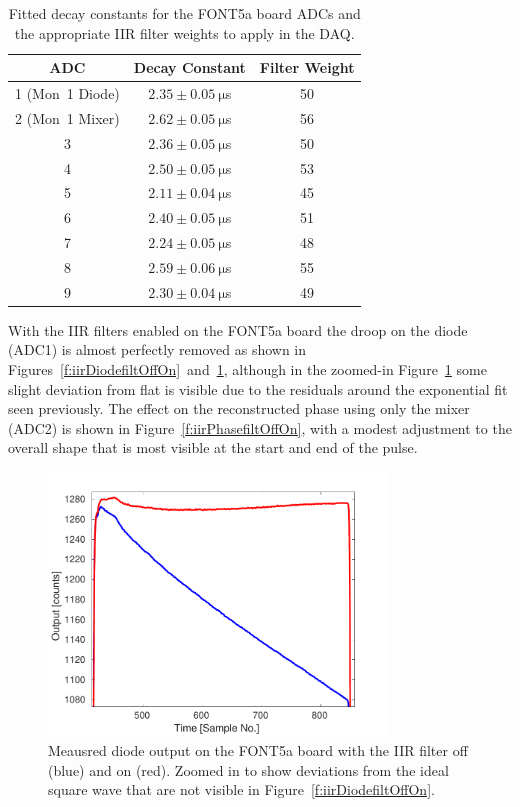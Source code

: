 \begin{table}
  \begin{center}
    \begin{tabular}{| c c c |}
	   \hline
       ADC & Decay Constant & Filter Weight \\ \hline
       1 (Mon~1 Diode) & \(2.35\pm0.05~\mathrm{\mu}\)s & 50 \\
	   2 (Mon~1 Mixer) & \(2.62\pm0.05~\mathrm{\mu}\)s & 56 \\
	   3 & \(2.36\pm0.05~\mathrm{\mu}\)s & 50 \\
	   4 & \(2.50\pm0.05~\mathrm{\mu}\)s & 53 \\
	   5 & \(2.11\pm0.04~\mathrm{\mu}\)s & 45 \\
	   6 & \(2.40\pm0.05~\mathrm{\mu}\)s & 51 \\
	   7 & \(2.24\pm0.05~\mathrm{\mu}\)s & 48 \\
	   8 & \(2.59\pm0.06~\mathrm{\mu}\)s & 55 \\
	   9 & \(2.30\pm0.04~\mathrm{\mu}\)s & 49 \\
 	   \hline
    \end{tabular}
    \caption{Fitted decay constants for the FONT5a board ADCs and the appropriate IIR filter weights to apply in the DAQ.}
  	\label{t:filtWeights}
  \end{center}
\end{table}

With the IIR filters enabled on the FONT5a board the droop on the diode (ADC1) is almost perfectly removed as shown in Figures~\ref{f:iirDiodefiltOffOn}~and~\ref{f:iirDiodefiltOffOn_zoom}, although in the zoomed-in Figure~\ref{f:iirDiodefiltOffOn_zoom} some slight deviation from flat is visible due to the residuals around the exponential fit seen previously. The effect on the reconstructed phase using only the mixer (ADC2) is shown in Figure~\ref{f:iirPhasefiltOffOn}, with a modest adjustment to the overall shape that is most visible at the start and end of the pulse.

\begin{figure}
  \centering
  \includegraphics[width=0.8\textwidth]{Figures/commissioning/iirDiodeFiltOffOn_zoom}
  \caption{Meausred diode output on the FONT5a board with the IIR filter off (blue) and on (red). Zoomed in to show deviations from the ideal square wave that are not visible in Figure~\ref{f:iirDiodefiltOffOn}.}
  \label{f:iirDiodefiltOffOn_zoom}
\end{figure}


